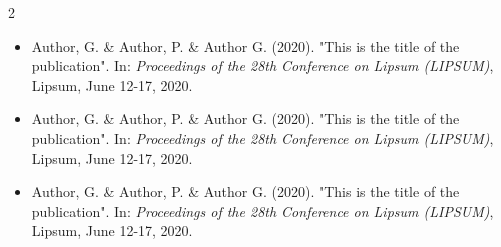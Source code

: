 \documentclass[10pt,A4,english]{article}
\begin{document}
\begin{paracol}{2}
\begin{rightcolumn}
\begin{itemize}[leftmargin=*]
\item Author, G. \& Author, P. \&  Author G. (2020). "This is the title of the publication". In: \textit{Proceedings of the 28th Conference on Lipsum (LIPSUM)}, Lipsum, June 12-17, 2020.
\item Author, G. \& Author, P. \&  Author G. (2020). "This is the title of the publication". In: \textit{Proceedings of the 28th Conference on Lipsum (LIPSUM)}, Lipsum, June 12-17, 2020.
\item Author, G. \& Author, P. \&  Author G. (2020). "This is the title of the publication". In: \textit{Proceedings of the 28th Conference on Lipsum (LIPSUM)}, Lipsum, June 12-17, 2020.
\end{itemize}
\mbox{}
\vfill
\mbox{}
\vfill
\mbox{}
\vfill
\mbox{}
\vfill
\mbox{}
\vfill
\mbox{}
\vfill
\mbox{}




\end{rightcolumn}
\end{paracol}
\end{document}
